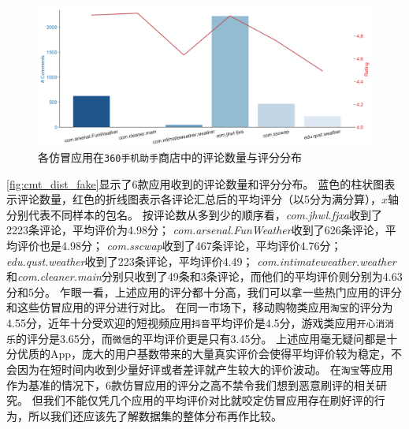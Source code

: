 %
%
%

\begin{figure}[htbp]
	\centering
	\includegraphics[width=\textwidth]{./Figures/edwin-cmt-ratings-dist-3.png}
    \caption{各仿冒应用在\texttt{360手机助手}商店中的评论数量与评分分布}
    \label{fig:cmt_dist_fake}
\end{figure}

\autoref{fig:cmt_dist_fake}显示了6款应用收到的评论数量和评分分布。
蓝色的柱状图表示评论数量，红色的折线图表示各评论汇总后的平均评分（以5分为满分算），$x$轴分别代表不同样本的包名。
按评论数从多到少的顺序看，\emph{com.jhwl.fjxa}收到了2223条评论，平均评价为4.98分；
\emph{com.arsenal.FunWeather}收到了626条评论，平均评价也是4.98分；
\emph{com.sscwap}收到了467条评论，平均评价4.76分；
\emph{edu.qust.weather}收到了223条评论，平均评价4.49；
\emph{com.intimateweather.weather}和\emph{com.cleaner.main}分别只收到了49条和3条评论，而他们的平均评价则分别为4.63分和5分。
乍眼一看，上述应用的评分都十分高，我们可以拿一些热门应用的评分和这些仿冒应用的评分进行对比。
在同一市场下，移动购物类应用\texttt{淘宝}的评分为4.55分，近年十分受欢迎的短视频应用\texttt{抖音}平均评价是4.5分，游戏类应用\texttt{开心消消乐}的评分是3.65分，而\texttt{微信}的平均评价更是只有3.45分。
上述应用毫无疑问都是十分优质的App，庞大的用户基数带来的大量真实评价会使得平均评价较为稳定，不会因为在短时间内收到少量好评或者差评就产生较大的评价波动。
在\texttt{淘宝}等应用作为基准的情况下，6款仿冒应用的评分之高不禁令我们想到恶意刷评的相关研究。
但我们不能仅凭几个应用的平均评价对比就咬定仿冒应用存在刷好评的行为，所以我们还应该先了解数据集的整体分布再作比较。

